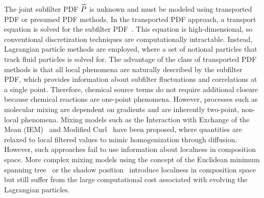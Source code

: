 The joint subfilter PDF $\widetilde{P}$ is unknown and must be modeled using transported PDF or presumed PDF methods. In the transported PDF approach, a transport equation is solved for the subfilter PDF~\cite{pope1985,pope1991}. This equation is high-dimensional, so conventional discretization techniques are computationally intractable. Instead, Lagrangian particle methods are employed, where a set of notional particles that track fluid particles is solved for. The advantage of the class of transported PDF methods is that all local phenomena are naturally described by the subfilter PDF, which provides information about subfilter fluctuations and correlations at a single point. Therefore, chemical source terms do not require additional closure because chemical reactions are one-point phenomena. However, processes such as molecular mixing are dependent on gradients and are inherently two-point, non-local phenomena. Mixing models such as the Interaction with Exchange of the Mean (IEM)~\cite{dopazo1974} and Modified Curl~\cite{janicka1979} have been proposed, where quantities are relaxed to local filtered values to mimic homogenization through diffusion. However, such approaches fail to use information about localness in composition space. More complex mixing models using the concept of the Euclidean minimum spanning tree~\cite{subramaniam1998} or the shadow position~\cite{pope2013} introduce localness in composition space but still suffer from the large computational cost associated with evolving the Lagrangian particles.


